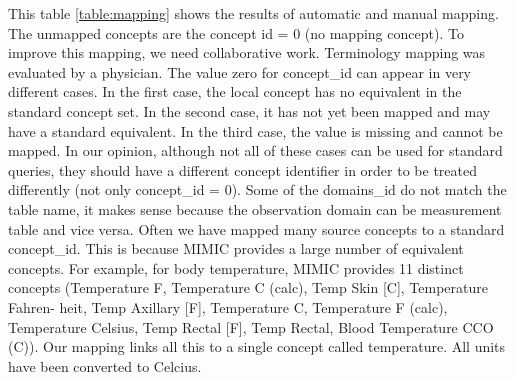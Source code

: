 \begin{table*}[t]
\label{table:lostrows}
\end{table*}


This table \ref{table:mapping} shows the results of automatic and manual mapping. 
The unmapped concepts are the concept id = 0 (no mapping concept). 
To improve this mapping, we need collaborative work. Terminology mapping was 
evaluated by a physician. The value zero for concept\_id can appear in very 
different cases. In the first case, the local concept has no equivalent in the 
standard concept set. In the second case, it has not yet been mapped and may 
have a standard equivalent. In the third case, the value is missing and cannot 
be mapped. In our opinion, although not all of these cases can be used for 
standard queries, they should have a different concept identifier in order to be 
treated differently (not only concept\_id = 0). Some of the domains\_id do not 
match the table name, it makes sense because the observation domain can be 
measurement table and vice versa.
Often we have mapped many source concepts to a standard concept\_id. This is 
because MIMIC provides a large number of equivalent concepts. For example, 
for body temperature, MIMIC provides 11 distinct concepts (Temperature F, 
Temperature C (calc), Temp Skin [C], Temperature Fahren- heit, Temp Axillary [F], 
Temperature C, Temperature F (calc), Temperature Celsius, Temp Rectal [F], 
Temp Rectal, Blood Temperature CCO (C)). Our mapping links all this to a single 
concept called temperature. All units have been converted to Celcius.

